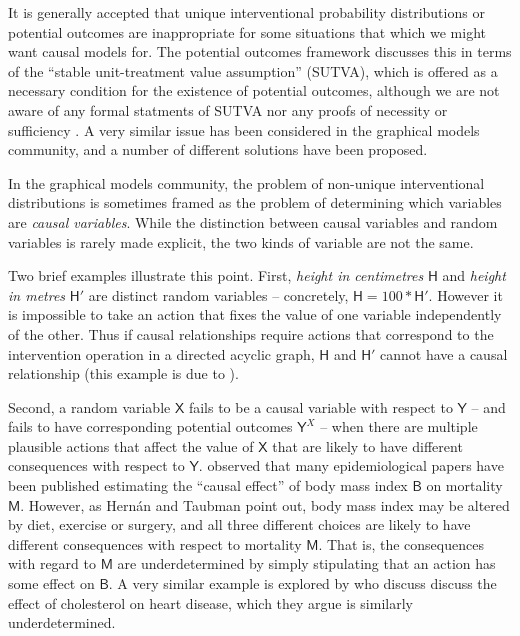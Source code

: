 \documentclass{article}
\theoremstyle{plain}
\theoremstyle{definition}
\newcommand{\RV}[1]{\ensuremath{\mathsf{#1}}}
\begin{document}
It is generally accepted that unique interventional probability distributions or potential outcomes are inappropriate for some situations that which we might want causal models for. The potential outcomes framework discusses this in terms of the ``stable unit-treatment value assumption'' (SUTVA), which is offered as a necessary condition for the existence of potential outcomes, although we are not aware of any formal statments of SUTVA nor any proofs of necessity or sufficiency \citet{rubin_causal_2005,imbens_causal_2015}. A very similar issue has been considered in the graphical models community, and a number of different solutions have been proposed.

In the graphical models community, the problem of non-unique interventional distributions is sometimes framed as the problem of determining which variables are \emph{causal variables}. While the distinction between causal variables and random variables is rarely made explicit, the two kinds of variable are not the same.

Two brief examples illustrate this point. First, \emph{height in centimetres} $\RV{H}$ and \emph{height in metres} $\RV{H}'$ are distinct random variables -- concretely, $\RV{H}=100*\RV{H}'$. However it is impossible to take an action that fixes the value of one variable independently of the other. Thus if causal relationships require actions that correspond to the intervention operation in a directed acyclic graph, $\RV{H}$ and $\RV{H}'$ cannot have a causal relationship (this example is due to \citet{eberhardt_contemporary_2022}).

Second, a random variable $\RV{X}$ fails to be a causal variable with respect to $\RV{Y}$ -- and fails to have corresponding potential outcomes $\RV{Y}^X$ -- when there are multiple plausible actions that affect the value of $\RV{X}$ that are likely to have different consequences with respect to $\RV{Y}$. \citet{hernan_does_2008} observed that many epidemiological papers have been published estimating the ``causal effect'' of body mass index $\RV{B}$ on mortality $\RV{M}$. However, as Hernán and Taubman point out, body mass index may be altered by diet, exercise or surgery, and all three different choices are likely to have different consequences with respect to mortality $\RV{M}$. That is, the consequences with regard to $\RV{M}$ are underdetermined by simply stipulating that an action has some effect on $\RV{B}$. A very similar example is explored by  \citet{spirtes_causal_2004,eberhardt_contemporary_2022} who discuss discuss the effect of cholesterol on heart disease, which they argue is similarly underdetermined.
\end{document}

